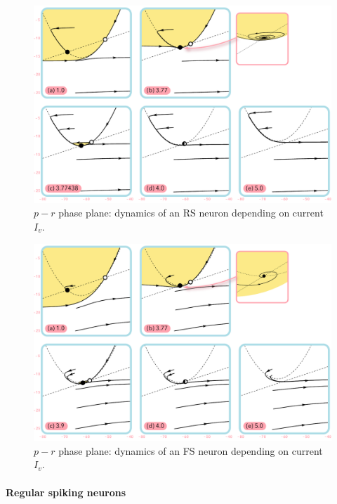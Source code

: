 \begin{figure}[!htp]
    \centering
    \includegraphics[width=\textwidth]{src/assets/images/neural-dynamics/nd-rs.pdf}
    \caption[Dynamics of an RS neuron]{$p-r$ phase plane: dynamics of an RS neuron depending on current $I_v$.}
    \label{fig:neural-dynamics-rs}
\end{figure}

\begin{figure}[!htp]
    \centering
    \includegraphics[width=\textwidth]{src/assets/images/neural-dynamics/nd-fs.pdf}
    \caption[Dynamics of an FS neuron]{$p-r$ phase plane: dynamics of an FS neuron depending on current $I_v$.}
    \label{fig:neural-dynamics-fs}
\end{figure}

\paragraph{Regular spiking neurons}

